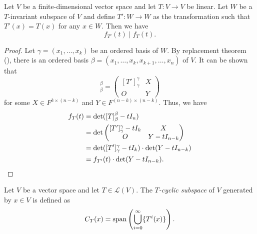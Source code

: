 \begin{theorem}
  Let $V$ be a finite-dimensional vector space and let $T: V \to V$ be linear.
  Let $W$ be a $T$-invariant subspace of $V$ and define $T': W \to W$ as the
  transformation such that $T'(x) = T(x)$ for any $x \in W$.
  Then we have
  \begin{equation*}
    f_{T'}(t) \mid f_T(t).
  \end{equation*}
\end{theorem}
\begin{proof}
  Let $\gamma = (x_1, \dots, x_k)$ be an ordered basis of $W$.
  By replacement theorem (), there is an ordered basis
  $\beta = (x_1, \dots, x_k, x_{k+1}, \dots, x_n)$ of $V$.
  It can be shown that
  \begin{equation*}
    [T]_\beta^\beta =
    \begin{pmatrix}
      [T']_\gamma^\gamma & X \\
      O & Y
    \end{pmatrix}
  \end{equation*}
  for some $X \in F^{k \times (n-k)}$ and $Y \in F^{(n-k) \times (n-k)}$.
  Thus, we have
  \begin{align*}
    f_T(t)
    &= \det([T]_\beta^\beta - tI_n) \\
    &= \det
    \begin{pmatrix}
      [T']_\gamma^\gamma - tI_k & X \\
      O & Y - tI_{n-k}
    \end{pmatrix} \\
    &= \det([T']_\gamma^\gamma - tI_k) \cdot \det(Y - tI_{n-k}) \\
    &= f_{T'}(t) \cdot \det(Y - tI_{n-k}).
    \qedhere
  \end{align*}
\end{proof}

\begin{definition}
  Let $V$ be a vector space and let $T \in \mathcal{L}(V)$.
  The \emph{$T$-cyclic subspace} of $V$ generated by $x \in V$ is defined as
  \begin{equation*}
    C_T(x) = \operatorname{span}\left(\bigcup_{i=0}^\infty \{T^i(x)\}\right).
  \end{equation*}
\end{definition}

